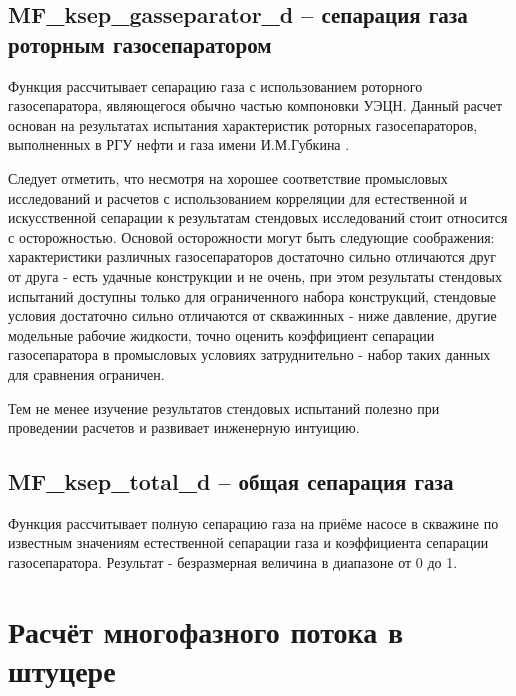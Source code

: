 
\subsection{MF\_ksep\_gasseparator\_d – сепарация газа роторным газосепаратором}
Функция рассчитывает сепарацию газа с использованием роторного газосепаратора, являющегося обычно частью компоновки УЭЦН. Данный расчет основан на результатах испытания характеристик роторных газосепараторов, выполненных в РГУ нефти и газа имени И.М.Губкина \cite{SPE_117415_2008}. 

Следует отметить, что несмотря на хорошее соответствие промысловых исследований и расчетов с использованием корреляции для естественной и искусственной сепарации \cite{SPE_117415_2008} к результатам стендовых исследований стоит относится с осторожностью. Основой осторожности могут быть следующие соображения: характеристики различных газосепараторов достаточно сильно отличаются друг от друга - есть удачные конструкции и не очень, при этом результаты стендовых испытаний доступны только для ограниченного набора конструкций, стендовые условия достаточно сильно отличаются от скважинных - ниже давление, другие модельные рабочие жидкости, точно оценить коэффициент сепарации газосепаратора в промысловых условиях затруднительно - набор таких данных для сравнения ограничен. 

Тем не менее изучение результатов стендовых испытаний полезно при проведении расчетов и развивает инженерную интуицию. 



\subsection{MF\_ksep\_total\_d – общая сепарация газа}

Функция рассчитывает полную сепарацию газа на приёме насосе в скважине по известным значениям естественной сепарации газа и коэффициента сепарации газосепаратора. Результат - безразмерная величина в диапазоне от 0 до 1. 


\section{Расчёт многофазного потока в штуцере}





